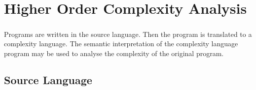 \chapter{Higher Order Complexity Analysis}
\paragraph{}
Programs are written in the source language. Then the program is translated
to a complexity language. The semantic interpretation of the complexity
language program may be used to analyse the complexity of the original
program.

\section{Source Language}


